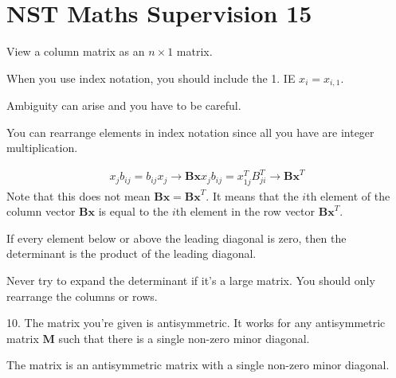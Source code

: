 \documentclass[10pt, a4paper]{article}
\begin{document}
\section*{NST Maths Supervision 15}

View a column matrix as an $n \times 1$ matrix.

When you use index notation, you should include the 1. IE $x_i = x_{i,1}$.

Ambiguity can arise and you have to be careful.

You can rearrange elements in index notation since all you have are integer multiplication.

\begin{gather*}
x_{j} b_{ij} = b_{ij}x_j \longrightarrow \mathbf{Bx}
x_{j} b_{ij} = x^T_{1j}B^T_{ji} \longrightarrow \mathbf{Bx}^T
\end{gather*}
Note that this does not mean $\mathbf{Bx} = \mathbf{Bx}^T$. It means that the $i$th element of the column vector
$\mathbf{Bx}$ is equal to the $i$th element in the row vector $\mathbf{Bx}^T$.

If every element below or above the leading diagonal is zero, then the determinant is the product of the leading
diagonal.

Never try to expand the determinant if it's a large matrix. You should only rearrange the columns or rows.

10. The matrix you're given is antisymmetric. It works for any antisymmetric matrix $\mathbf{M}$ such that there is a
 single non-zero minor diagonal.
 
The matrix is an antisymmetric matrix with a single non-zero minor diagonal.
\end{document}
